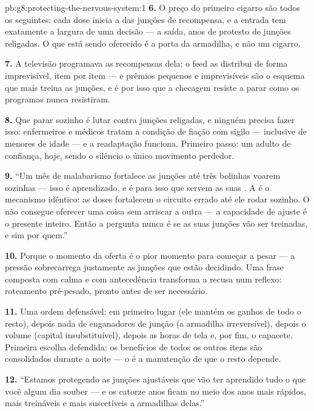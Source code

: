 \begin{solution}{pb:g8:protecting-the-nervous-system:1}
\textbf{6.} O preço do primeiro cigarro são todos os seguintes: cada
dose inicia a  das junções de recompensa, e a entrada tem
exatamente a largura de uma decisão --- a saída, anos de protesto de
junções religadas. O que está sendo oferecido é a porta da armadilha,
e não um cigarro.

\textbf{7.} A televisão programava as recompensas dela; o feed as
distribui de forma imprevisível, item por item --- e prêmios pequenos e
imprevisíveis são o esquema que mais treina as junções, e é por isso
que a checagem resiste a parar como os programas nunca resistiram.

\textbf{8.} Que parar sozinho é lutar contra junções religadas, e
ninguém precisa fazer isso: enfermeiros e médicos tratam a condição de
fiação com sigilo --- inclusive de menores de idade --- e a readaptação
funciona. Primeiro passo: um adulto de confiança, hoje, sendo o
silêncio o único movimento perdedor.

\textbf{9.} ``Um mês de malabarismo fortalece as junções até três
bolinhas voarem sozinhas --- isso é aprendizado, e é para isso que
servem as suas . A  é o mecanismo idêntico: as
doses fortalecem o circuito errado até ele rodar sozinho. O 
não consegue oferecer uma coisa sem arriscar a outra --- a capacidade
de ajuste é o presente inteiro. Então a pergunta nunca é se as suas
junções vão ser treinadas, e sim por quem.''

\textbf{10.} Porque o momento da oferta é o pior momento para começar
a pesar --- a pressão sobrecarrega justamente as junções que estão
decidindo. Uma frase composta com calma e com antecedência transforma
a recusa num reflexo: roteamento pré-pesado, pronto antes de ser
necessário.

\textbf{11.} Uma ordem defensável:  em primeiro lugar (ele mantém
os ganhos de todo o resto), depois nada de enganadores de junção (a
armadilha irreversível), depois o volume (capital insubstituível),
depois as horas de tela e, por fim, o capacete. Primeira escolha
defendida: os benefícios de todos os outros itens são consolidados
durante a noite --- o  é a manutenção de que o resto depende.

\textbf{12.} ``Estamos protegendo as junções ajustáveis que vão ter
aprendido tudo o que você algum dia souber --- e os catorze anos ficam
no meio dos anos mais rápidos, mais treináveis e mais suscetíveis a
armadilhas delas.''
\end{solution}
